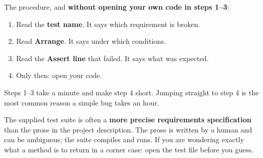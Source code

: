 The procedure, and \textbf{without opening your own code in steps 1--3}:

\begin{enumerate}
  \item Read the \textbf{test name}. It says which requirement is broken.
  \item Read \textbf{Arrange}. It says under which conditions.
  \item Read the \textbf{Assert line} that failed. It says what was expected.
  \item Only then: open your code.
\end{enumerate}

Steps 1--3 take a minute and make step 4 short. Jumping straight to step 4 is the most common
reason a simple bug takes an hour.

\begin{aside}
\note The supplied test suite is often a \textbf{more precise requirements specification} than the
prose in the project description. The prose is written by a human and can be ambiguous; the suite
compiles and runs. If you are wondering exactly what a method is to return in a corner case: open
the test file before you guess.
\end{aside}
